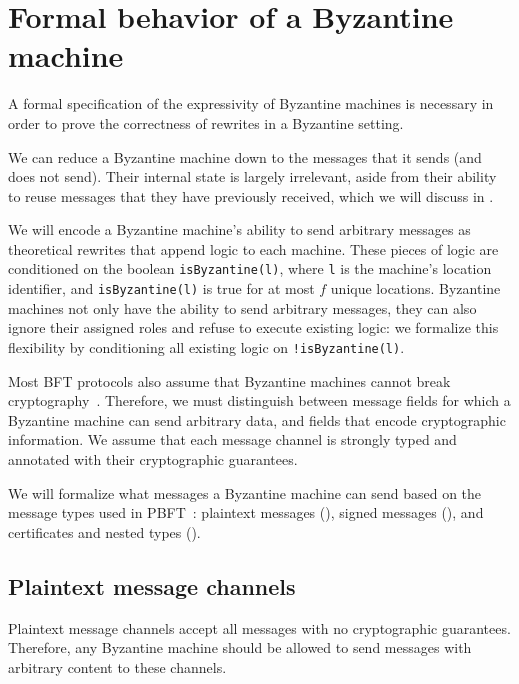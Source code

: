 \section{Formal behavior of a Byzantine machine}
\label{sec:bft-formalism}
A formal specification of the expressivity of Byzantine machines is necessary in order to prove the correctness of rewrites in a Byzantine setting.

We can reduce a Byzantine machine down to the messages that it sends (and does not send).
Their internal state is largely irrelevant, aside from their ability to reuse messages that they have previously received, which we will discuss in .

We will encode a Byzantine machine's ability to send arbitrary messages as theoretical rewrites that append logic to each machine.
These pieces of logic are conditioned on the boolean \texttt{isByzantine(l)}, where \texttt{l} is the machine's location identifier, and \texttt{isByzantine(l)} is true for at most $f$ unique locations.
Byzantine machines not only have the ability to send arbitrary messages, they can also ignore their assigned roles and refuse to execute existing logic: we formalize this flexibility by conditioning all existing logic on \texttt{!isByzantine(l)}.

Most BFT protocols also assume that Byzantine machines cannot break cryptography~\cite{pbft}.
Therefore, we must distinguish between message fields for which a Byzantine machine can send arbitrary data, and fields that encode cryptographic information.
We assume that each message channel is strongly typed and annotated with their cryptographic guarantees.

We will formalize what messages a Byzantine machine can send based on the message types used in PBFT~\cite{pbft}: plaintext messages (), signed messages (), and certificates and nested types ().

\subsection{Plaintext message channels}
\label{sec:plaintext-channels-formalism}
Plaintext message channels accept all messages with no cryptographic guarantees.
Therefore, any Byzantine machine should be allowed to send messages with arbitrary content to these channels.

